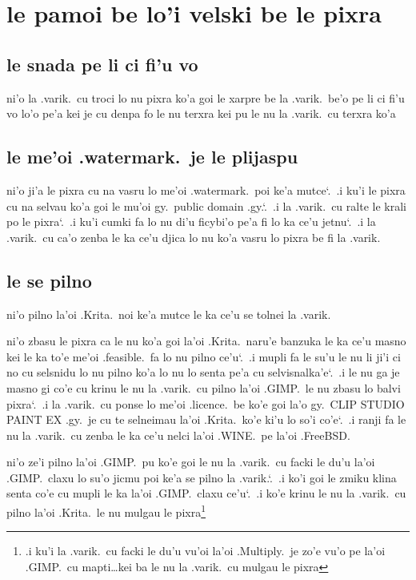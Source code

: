 \documentclass{report}
\newcommand\sds{\spacefactor\sfcode`.\ \space}
\begin{document}
\section{le pamoi be lo'i velski be le pixra}
\subsection{le snada pe li ci fi'u vo}
ni'o la .varik.\ cu troci lo nu pixra ko'a goi le xarpre be la .varik.\ be'o pe li ci fi'u vo lo'o pe'a kei je cu denpa fo le nu terxra kei pu le nu la .varik.\ cu terxra ko'a
\subsection{le me'oi .watermark.\ je le plijaspu}
ni'o ji'a le pixra cu na vasru lo me'oi .watermark.\ poi ke'a mutce\sds  .i ku'i le pixra cu na selvau ko'a goi le mu'oi gy.\ public domain .gy.\sds  .i la .varik.\ cu ralte le krali po le pixra\sds  .i ku'i cumki fa lo nu di'u ficybi'o pe'a fi lo ka ce'u jetnu\sds  .i la .varik.\ cu ca'o zenba le ka ce'u djica lo nu ko'a vasru lo pixra be fi la .varik.

\subsection{le se pilno}
ni'o pilno la'oi .Krita.\ noi ke'a mutce le ka ce'u se tolnei la .varik.

ni'o zbasu le pixra ca le nu ko'a goi la'oi .Krita.\ naru'e banzuka le ka ce'u masno kei le ka to'e me'oi .feasible.\ fa lo nu pilno ce'u\sds  .i mupli fa le su'u le nu li ji'i ci no cu selsnidu lo nu pilno ko'a lo nu lo senta pe'a cu selvisnalka'e\sds  .i le nu ga je masno gi co'e cu krinu le nu la .varik.\ cu pilno la'oi .GIMP.\ le nu zbasu lo balvi pixra\sds  .i la .varik.\ cu ponse lo me'oi .licence.\ be ko'e goi la'o gy.\ CLIP STUDIO PAINT EX .gy.\ je cu te selneimau la'oi .Krita.\ ko'e ki'u lo so'i co'e\sds  .i ranji fa le nu la .varik.\ cu zenba le ka ce'u nelci la'oi .WINE.\ pe la'oi .FreeBSD.

ni'o ze'i pilno la'oi .GIMP.\ pu ko'e goi le nu la .varik.\ cu facki le du'u la'oi .GIMP.\ claxu lo su'o jicmu poi ke'a se pilno la .varik.\sds  .i ko'i goi le zmiku klina senta co'e cu mupli le ka la'oi .GIMP.\ claxu ce'u\sds  .i ko'e krinu le nu la .varik.\ cu pilno la'oi .Krita.\ le nu mulgau le pixra\footnote{.i ku'i la .varik.\ cu facki le du'u vu'oi la'oi .Multiply.\ je zo'e vu'o pe la'oi .GIMP.\ cu mapti\ldots kei ba le nu la .varik.\ cu mulgau le pixra}
\end{document}
